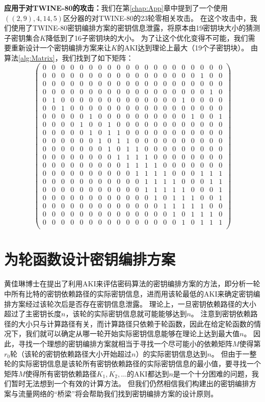 \noindent
\textbf{应用于对TWINE-80的攻击：}我们在第\ref{chap:App}章中提到了一个使用$((2,9),4,14,5)$区分器的对TWINE-80的23轮零相关攻击。
在这个攻击中，我们使用了TWINE-80密钥编排方案的密钥信息泄露，将原本由19密钥块大小的猜测子密钥集合$K$降低到了16子密钥块的大小。
为了让这个优化变得不可能，我们需要重新设计一个密钥编排方案来让$K$的AKI达到理论上最大（19个子密钥块）。
由算法\ref{alg:Matrix}，我们找到了如下矩阵：
$$\left(
    \begin{array}{cccccccccccccccccccc}
0&0&0&0&0&0&0&0&0&0&0&0&0&0&0&0&0&0&0&0\\
0&0&0&0&0&0&0&0&0&0&0&0&0&0&0&0&0&1&0&0\\
0&0&0&0&0&0&0&0&0&0&0&0&0&0&0&0&0&0&0&0\\
0&0&0&0&0&0&0&0&0&0&0&0&0&0&0&0&0&0&1&0\\
0&1&0&0&0&0&0&0&0&0&0&0&0&0&0&1&0&0&0&0\\
0&0&1&0&0&0&0&0&0&0&0&0&0&0&0&0&0&0&0&0\\
0&0&0&0&0&1&0&0&0&0&0&0&0&0&0&0&1&0&0&1\\
0&0&0&0&1&0&0&1&0&0&0&0&0&0&0&0&0&0&0&0\\
0&0&0&0&0&1&0&1&1&0&0&0&0&0&0&0&0&0&0&0\\
0&0&0&0&0&0&1&0&1&1&0&0&0&0&0&0&0&0&0&0\\
0&0&0&0&0&0&0&1&0&1&1&0&0&0&0&0&0&0&0&0\\
0&0&0&0&0&0&0&0&1&1&1&1&0&0&0&0&0&0&0&0\\
0&0&0&0&0&0&0&0&0&1&1&1&1&0&0&0&0&0&0&0\\
0&0&0&0&0&0&0&0&0&0&1&1&1&1&0&0&0&1&1&1\\
0&0&0&0&0&0&0&0&0&0&0&1&1&1&1&0&0&0&1&1\\
0&0&0&0&0&0&0&0&0&0&0&1&1&1&1&1&0&0&0&1\\
0&0&0&0&0&0&0&0&0&0&0&0&1&0&1&1&1&0&0&1\\
0&0&0&0&0&0&0&0&0&0&0&0&0&1&1&1&1&1&0&0\\
0&0&0&0&0&0&0&0&0&0&0&0&0&0&1&0&1&1&1&0\\
0&0&0&0&0&0&0&0&0&0&0&0&0&0&0&1&0&1&1&1\\
\end{array}
\right)
$$

\section{为轮函数设计密钥编排方案}
黄佳琳博士在提出了利用AKI来评估密码算法的密钥编排方案的方法，即分析一轮中所有比特的密钥依赖路径的实际密钥信息，进而用该轮最低的AKI来确定密钥编排方案经过该轮次后是否存在密钥信息泄露。
理论上，一旦密钥依赖路径的大小超过了主密钥长度$n$，该轮的实际密钥信息就可能能够达到$n$。
注意到密钥依赖路径的大小只与计算路径有关，而计算路径只依赖于轮函数，因此在给定轮函数的情况下，我们就可以确定从哪一轮开始实际密钥信息能够在理论上达到最大值$n$。
因此，寻找一个理想的密钥编排方案就相当于寻找一个尽可能小的依赖矩阵$M$使得第$r_0$轮（该轮的密钥依赖路径大小开始超过$n$）的实际密钥信息达到$n$。
但由于一整轮的实际密钥信息是该轮所有密钥依赖路径的实际密钥信息的最小值，要寻找一个矩阵$M$使得所有密钥依赖路径$K_1,K_2,\dots$的AKI都达到$n$是一个十分困难的问题，我们暂时无法想到一个有效的计算方法。
但我们仍然相信我们构建出的密钥编排方案与流量网络的“桥梁”将会帮助我们找到密钥编排方案的设计原则。

